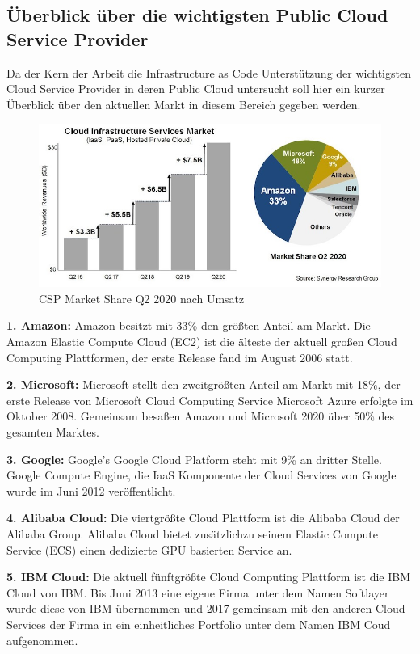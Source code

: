 \begin{spacing}{1.2}
\subsection{Überblick über die wichtigsten Public Cloud Service Provider}
Da der Kern der Arbeit die Infrastructure as Code Unterstützung der
wichtigsten Cloud Service Provider in deren Public Cloud untersucht soll hier
ein kurzer Überblick über den aktuellen Markt in diesem Bereich gegeben werden.

\begin{figure}[H]
  \includegraphics[width=1.0\textwidth]{fig/hauptteil/CIS_Q220.jpg}
  \caption{CSP Market Share Q2 2020 nach Umsatz}
  \centering
\end{figure}

\textbf{1. Amazon: } Amazon besitzt mit 33\% den größten Anteil am Markt.
Die Amazon Elastic Compute Cloud (EC2) ist die älteste der aktuell großen Cloud
Computing Plattformen, der erste Release fand im August 2006 statt.

\textbf{2. Microsoft: } Microsoft stellt den zweitgrößten Anteil am Markt mit
18\%, der erste Release von Microsoft Cloud Computing Service Microsoft Azure
erfolgte im Oktober 2008. Gemeinsam besaßen Amazon und Microsoft 2020 über 50\%
des gesamten Marktes.

\textbf{3. Google: } Google's Google Cloud Platform steht mit 9\% an dritter
Stelle. Google Compute Engine, die IaaS Komponente der Cloud Services von
Google wurde im Juni 2012 veröffentlicht.

\textbf{4. Alibaba Cloud: } Die viertgrößte Cloud Plattform ist die
Alibaba Cloud der Alibaba Group. Alibaba Cloud bietet zusätzlichzu seinem
Elastic Compute Service (ECS) einen dedizierte GPU basierten Service an. 

\textbf{5. IBM Cloud: } Die aktuell fünftgrößte Cloud Computing Plattform ist
die IBM Cloud von IBM. Bis Juni 2013 eine eigene Firma unter dem Namen Softlayer
wurde diese von IBM übernommen und 2017 gemeinsam mit den anderen Cloud Services
der Firma in ein einheitliches Portfolio unter dem Namen IBM Coud aufgenommen.\\


\end{spacing}
